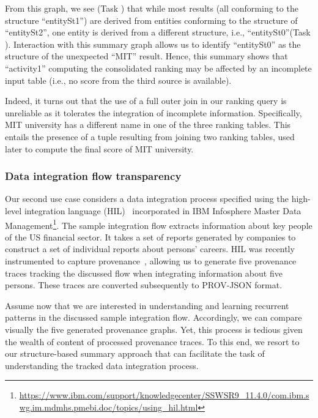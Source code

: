 From this graph, we see (Task ) that while most results (all conforming to the structure ``entitySt1'') are derived from entities conforming to the structure of ``entitySt2'', one entity is derived from a different structure, i.e., ``entitySt0''(Task ). Interaction with this summary graph allows us to identify ``entitySt0'' as the structure of the unexpected ``MIT'' result. Hence, this summary shows that ``activity1'' computing the consolidated ranking may be affected by an incomplete input table (i.e., no score from the third source is available).



Indeed, it turns out that the use of a full outer join in our ranking query is unreliable as it tolerates the integration of incomplete information. Specifically, MIT university has a different name in one of the three ranking tables. 
This entails the presence of a tuple resulting from joining two ranking tables, used later to compute the final score of MIT university. 





\subsubsection{Data integration flow transparency}

Our second use case considers a data integration process specified using the high-level integration language (HIL)~\cite{hernandez:edbt13}  incorporated in IBM Infosphere Master Data Management\footnote{\url{https://www.ibm.com/support/knowledgecenter/SSWSR9_11.4.0/com.ibm.swg.im.mdmhs.pmebi.doc/topics/using_hil.html}}.
The sample integration flow extracts information about key people of the US financial sector. It takes a set of reports generated by companies to construct a set of individual reports about persons' careers.
HIL was recently instrumented to capture provenance~\cite{Oppold:IPAW18}, allowing us to generate five provenance traces tracking the discussed flow when integrating information about five persons.
These traces are converted subsequently to PROV-JSON format. 

Assume now that we are interested in understanding and learning recurrent patterns in the discussed sample integration flow. Accordingly, we can compare visually the five generated provenance graphs.
Yet, this process is tedious given the wealth of content of processed provenance traces.
To this end, we resort to our structure-based summary approach that can facilitate the task of understanding  the tracked data integration process.

